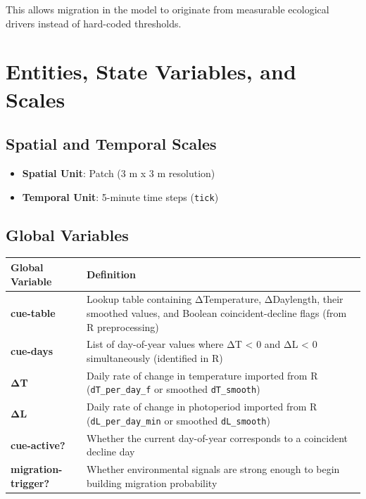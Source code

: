 \documentclass[
]{book}
\providecommand{\tightlist}{%
  \setlength{\itemsep}{0pt}\setlength{\parskip}{0pt}}
\begin{document}
This allows migration in the model to originate from measurable ecological drivers instead of hard-coded thresholds.

\section{Entities, State Variables, and Scales}\label{entities-state-variables-and-scales-3}

\subsection{Spatial and Temporal Scales}\label{spatial-and-temporal-scales-3}

\begin{itemize}
\tightlist
\item
  \textbf{Spatial Unit}: Patch (3 m x 3 m resolution)
\item
  \textbf{Temporal Unit}: 5-minute time steps (\texttt{tick})
\end{itemize}

\subsection{Global Variables}\label{global-variables-3}

\begin{longtable}[]{@{}
  >{\raggedright\arraybackslash}p{}
  >{\raggedright\arraybackslash}p{}@{}}
\toprule\noalign{}
\begin{minipage}[b]{\linewidth}\raggedright
Global Variable
\end{minipage} & \begin{minipage}[b]{\linewidth}\raggedright
Definition
\end{minipage} \\
\midrule\noalign{}
\endhead
\bottomrule\noalign{}
\endlastfoot
\textbf{cue-table} & Lookup table containing ΔTemperature, ΔDaylength, their smoothed values, and Boolean coincident-decline flags (from R preprocessing) \\
\textbf{cue-days} & List of day-of-year values where ΔT \textless{} 0 and ΔL \textless{} 0 simultaneously (identified in R) \\
\textbf{ΔT} & Daily rate of change in temperature imported from R (\texttt{dT\_per\_day\_f} or smoothed \texttt{dT\_smooth}) \\
\textbf{ΔL} & Daily rate of change in photoperiod imported from R (\texttt{dL\_per\_day\_min} or smoothed \texttt{dL\_smooth}) \\
\textbf{cue-active?} & Whether the current day-of-year corresponds to a coincident decline day \\
\textbf{migration-trigger?} & Whether environmental signals are strong enough to begin building migration probability \\
\end{longtable}
\end{document}

